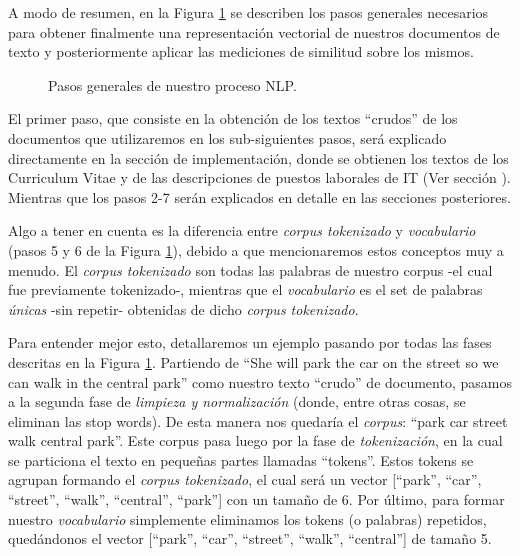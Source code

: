 \documentclass[12pt,a4paper]{article}
\begin{document}
\begin{sloppypar}
A modo de resumen, en la Figura \ref{fig:Imagen_NLP_1} se describen los pasos generales necesarios para obtener finalmente una representación vectorial de nuestros documentos de texto y posteriormente aplicar las mediciones de similitud sobre los mismos.

\begin{figure}[H]    %
 \centering
 \noindent{}
 \caption{Pasos generales de nuestro proceso NLP.}
 \label{fig:Imagen_NLP_1}
\end{figure}

\cleardoublepage

El primer paso, que consiste en la obtención de los textos “crudos” de los documentos que utilizaremos en los sub-siguientes pasos, será explicado directamente en la sección de implementación, donde se obtienen los textos de los Curriculum Vitae y de las descripciones de puestos laborales de IT (Ver sección \textit{}). Mientras que los pasos 2-7 serán explicados en detalle en las secciones posteriores. 

Algo a tener en cuenta es la diferencia entre \textit{corpus tokenizado} y \textit{vocabulario} (pasos 5 y 6 de la Figura \ref{fig:Imagen_NLP_1}), debido a que mencionaremos estos conceptos muy a menudo. El \textit{corpus tokenizado} son todas las palabras de nuestro corpus -el cual fue previamente tokenizado-, mientras que el \textit{vocabulario} es el set de palabras \textit{únicas} -sin repetir- obtenidas de dicho \textit{corpus tokenizado}.

Para entender mejor esto, detallaremos un ejemplo pasando por todas las fases descritas en la Figura \ref{fig:Imagen_NLP_1}. Partiendo de “She will park the car on the street so we can walk in the central park” como nuestro texto “crudo” de documento, pasamos a la segunda fase de \textit{limpieza y normalización} (donde, entre otras cosas, se eliminan las stop words). De esta manera nos quedaría el \textit{corpus}: “park car street walk central park”. Este corpus pasa luego por la fase de \textit{tokenización}, en la cual se particiona el texto en pequeñas partes llamadas “tokens”. Estos tokens se agrupan formando el \textit{corpus tokenizado}, el cual será un vector [“park”, “car”, “street”, “walk”, “central”, “park”] con un tamaño de 6. Por último, para formar nuestro \textit{vocabulario} simplemente eliminamos los tokens (o palabras) repetidos, quedándonos el vector [“park”, “car”, “street”, “walk”, “central”] de tamaño 5. 
\\


\end{sloppypar}
\end{document}

